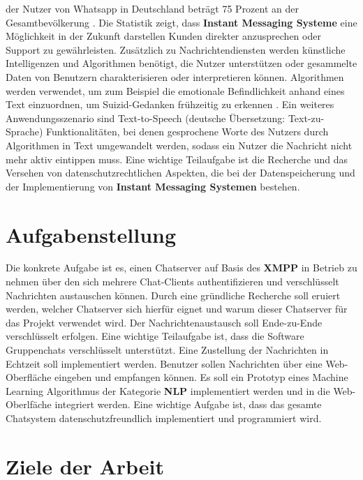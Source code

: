 \documentclass[a4paper,titlepage,halfparskip,12pt]{scrreprt}
\begin{document}
\begin{onehalfspacing}
der Nutzer von Whatsapp in Deutschland beträgt 75 Prozent an der Gesamtbevölkerung \cite{statistaIMS}. Die Statistik zeigt, dass \textbf{Instant Messaging Systeme} eine Möglichkeit in der Zukunft darstellen Kunden direkter anzusprechen oder Support zu gewährleisten. Zusätzlich zu Nachrichtendiensten werden künstliche Intelligenzen und Algorithmen benötigt, die Nutzer unterstützen oder gesammelte Daten von Benutzern charakterisieren oder interpretieren können. Algorithmen werden verwendet, um zum Beispiel die emotionale Befindlichkeit anhand eines Text einzuordnen, um Suizid-Gedanken frühzeitig zu erkennen \cite{stasytisIME}. Ein weiteres Anwendungsszenario sind Text-to-Speech (deutsche Übersetzung: Text-zu-Sprache) Funktionalitäten, bei denen gesprochene Worte des Nutzers durch Algorithmen in Text umgewandelt werden, sodass ein Nutzer die Nachricht nicht mehr aktiv eintippen muss. Eine wichtige Teilaufgabe ist die Recherche und das Versehen von datenschutzrechtlichen Aspekten, die bei der Datenspeicherung und der Implementierung von \textbf{Instant Messaging Systemen} bestehen.

\section{Aufgabenstellung}
\label{sec:Aufgabenstellung}

Die konkrete Aufgabe ist es, einen Chatserver auf Basis des \textbf{\ac{XMPP}} in Betrieb zu nehmen über den sich mehrere Chat-Clients authentifizieren und verschlüsselt Nachrichten austauschen können. Durch eine gründliche Recherche soll eruiert werden, welcher Chatserver sich hierfür eignet und warum dieser Chatserver für das Projekt verwendet wird. Der Nachrichtenaustausch soll Ende-zu-Ende verschlüsselt erfolgen. Eine wichtige Teilaufgabe ist, dass die Software Gruppenchats verschlüsselt unterstützt. Eine Zustellung der Nachrichten in Echtzeit soll implementiert werden. Benutzer sollen Nachrichten über eine Web-Oberfläche eingeben und empfangen können. Es soll ein Prototyp eines Machine Learning Algorithmus der Kategorie \textbf{\ac{NLP}} implementiert werden und in die Web-Oberlfäche integriert werden. Eine wichtige Aufgabe ist, dass das gesamte Chatsystem datenschutzfreundlich implementiert und programmiert wird.

\section{Ziele der Arbeit}
\label{sec:Ziele}


\end{onehalfspacing}
\end{document}
